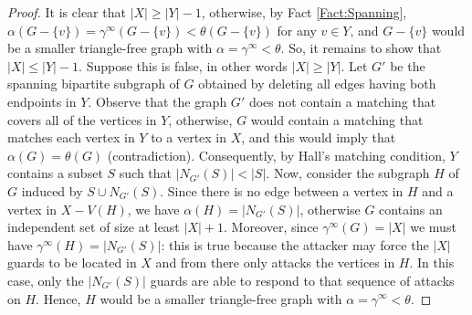\documentclass[11pt]{article}
\begin{document}
	\begin{proof}
		It is clear that $|X| \geq |Y|-1$, otherwise, by Fact \ref{Fact:Spanning}, $\alpha(G-\{v\})=\gamma^\infty(G-\{v\})<\theta(G-\{v\})$ for any $v \in Y$, and $G-\{v\}$ would be a smaller triangle-free graph with $\alpha=\gamma^\infty<\theta$. So, it remains to show that $|X| \leq |Y|-1$. Suppose this is false, in other words $|X| \geq |Y|$. Let $G'$ be the spanning bipartite subgraph of $G$ obtained by deleting all edges having both endpoints in $Y$. Observe that the graph $G'$ does not contain a matching that covers all of the vertices in $Y$, otherwise, $G$ would contain a matching that matches each vertex in $Y$ to a vertex in $X$, and this would imply that $\alpha(G)=\theta(G)$ (contradiction). Consequently, by Hall's matching condition, $Y$ contains a subset $S$ such that $|N_{G'}(S)|<|S|$. Now, consider the subgraph $H$ of $G$ induced by $S \cup N_{G'}(S)$. Since there is no edge between a vertex in $H$ and a vertex in $X-V(H)$, we have $\alpha(H)=|N_{G'}(S)|$, otherwise $G$ contains an independent set of size at least $|X|+1$. Moreover, since $\gamma^\infty(G)=|X|$ we must have $\gamma^\infty(H)=|N_{G'}(S)|$: this is true because the attacker may force the $|X|$ guards to be located in $X$ and from there only attacks the vertices in $H$. In this case, only the $|N_{G'}(S)|$ guards are able to respond to that sequence of attacks on $H$. Hence, $H$ would be a smaller triangle-free graph with $\alpha=\gamma^\infty<\theta$.
	\end{proof}
	
\end{document}
